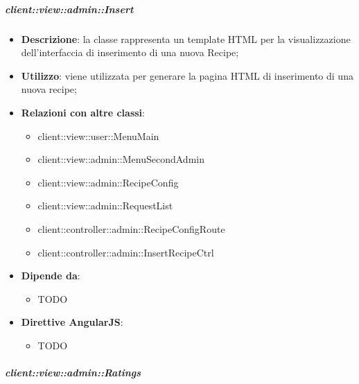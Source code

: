 		\subparagraph{client::view::admin::Insert} %
		\label{subp:bdsm_app_client_view_admin_insert}

			\begin{itemize}
				\item \textbf{Descrizione}: la classe rappresenta un template HTML per la visualizzazione dell'interfaccia di inserimento di una nuova Recipe;
				\item \textbf{Utilizzo}: viene utilizzata per generare la pagina HTML di inserimento di una nuova recipe;
				\item \textbf{Relazioni con altre classi}:
					\begin{itemize}
						\item client::view::user::MenuMain
						\item client::view::admin::MenuSecondAdmin
						\item client::view::admin::RecipeConfig
						\item client::view::admin::RequestList
						\item client::controller::admin::RecipeConfigRoute
						\item client::controller::admin::InsertRecipeCtrl
					\end{itemize}
				\item \textbf{Dipende da}:
					\begin{itemize}
						\item TODO
					\end{itemize}
				\item \textbf{Direttive AngularJS}:
					\begin{itemize}
						\item TODO
					\end{itemize}
			\end{itemize}

		\subparagraph{client::view::admin::Ratings} %
		\label{subp:bdsm_app_client_view_admin_ratings}

